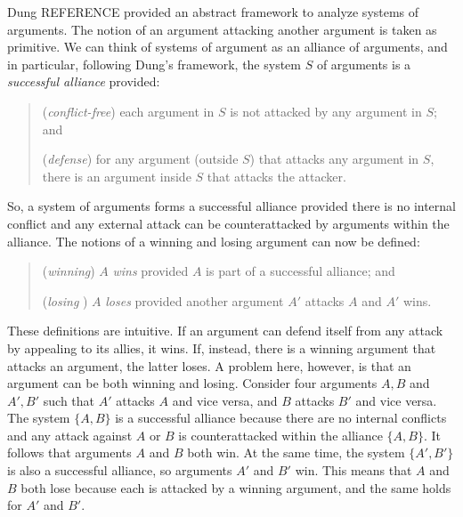 \documentclass[10pt]{article}
\begin{document}
Dung REFERENCE provided an abstract framework to analyze 
systems of arguments. The notion of an argument attacking another argument 
is taken as primitive. We can think of systems of argument as an alliance of arguments, and in particular, 
following Dung's framework, the system $S$ of arguments is a \textit{successful alliance} provided:
%
\begin{quote}
(\textit{conflict-free}) each argument in $S$ is not attacked by any argument in $S$; and 

(\textit{defense}) for any argument (outside $S$) that attacks any argument in $S$, there is an argument inside $S$ that attacks the attacker.
\end{quote}
%
So, a system of arguments forms a successful alliance provided there is no internal conflict and any external attack 
can be counterattacked by arguments within the alliance. The notions of a winning and losing argument can now be defined:
%
\begin{quote}
(\textit{winning})  $A$ \textit{wins} provided $A$ is part of a successful alliance; and 

(\textit{losing} ) $A$ \textit{loses} provided another argument $A'$ attacks $A$ and $A'$ wins. 
\end{quote}
%
These definitions are intuitive. If an argument can defend itself from any attack by appealing to its allies, it wins. If, instead, there is a winning argument that attacks an argument, the latter loses. A problem here, however, is that an argument can be both winning and losing. 
Consider four arguments $A, B$ and $A', B'$ such that $A'$ attacks $A$ and vice versa, and $B$ attacks $B'$ and vice versa. The system $\{A, B\}$ is a successful alliance because there are no internal conflicts and any attack against $A$ or $B$ is counterattacked within the alliance $\{A, B\}$. It follows that arguments $A$ and $B$  both win. At the same time, the system $\{ A', B'\}$ is also 
a successful alliance, so arguments $A'$ and $B'$ win. This means that $A$ and $B$ both lose because each is attacked by a winning argument, and the same holds for $A'$ and $B'$.

\end{document}
